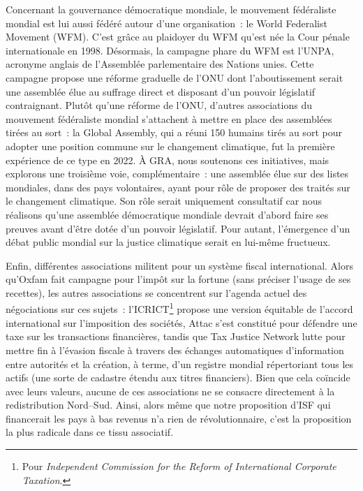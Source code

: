 \documentclass[a5paper,french,openany]{memoir}
\begin{document}
Concernant la gouvernance démocratique mondiale, le mouvement fédéraliste mondial est lui aussi fédéré autour d'une organisation~: le World Federalist Movement (WFM). C'est grâce au plaidoyer du WFM qu'est née la Cour pénale internationale en 1998. Désormais, la campagne phare du WFM est l'UNPA, acronyme anglais de l'Assemblée parlementaire des Nations unies. Cette campagne propose une réforme graduelle de l'ONU dont l'aboutissement serait une assemblée élue au suffrage direct et disposant d'un pouvoir législatif contraignant. Plutôt qu'une réforme de l'ONU, d'autres associations du mouvement fédéraliste mondial s'attachent à mettre en place des assemblées tirées au sort~: la Global Assembly, qui a réuni 150 humains tirés au sort pour adopter une position commune sur le changement climatique, fut la première expérience de ce type en 2022. 
À GRA, nous soutenons ces initiatives, mais explorons une troisième voie, complémentaire~: 
une assemblée élue sur des listes mondiales, dans des pays volontaires, ayant pour rôle de proposer des traités sur le changement climatique. 
Son rôle serait uniquement consultatif car nous réalisons qu'une assemblée démocratique mondiale devrait d'abord faire ses preuves avant d'être dotée d'un pouvoir législatif. Pour autant, l'émergence d'un débat public mondial sur la justice climatique serait en lui-même fructueux. 

Enfin, différentes associations militent pour un système fiscal international. Alors qu'Oxfam fait campagne pour l'impôt sur la fortune (sans préciser l'usage de ses recettes), les autres associations se concentrent sur l'agenda actuel des négociations sur ces sujets~: l'ICRICT\footnote{Pour \textit{Independent Commission for the Reform of International Corporate Taxation}.} 
propose une version équitable de l'accord international sur l'imposition des sociétés, Attac s'est constitué pour défendre une taxe sur les transactions financières, tandis que Tax Justice Network lutte pour mettre fin à l'évasion fiscale à travers des échanges automatiques d'information entre autorités et la création, à terme, d'un registre mondial répertoriant tous les actifs (une sorte de cadastre étendu aux titres financiers). Bien que cela coïncide avec leurs valeurs, aucune de ces associations ne se consacre directement à la redistribution Nord--Sud. Ainsi, alors même que notre proposition d'ISF qui financerait les pays à bas revenus n'a rien de révolutionnaire, c'est la proposition la plus radicale dans ce tissu associatif. 
\end{document}
